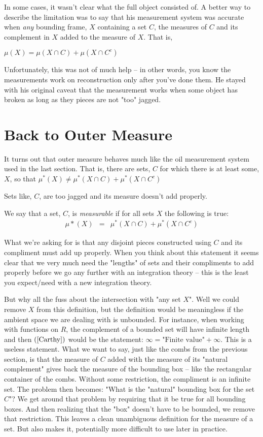 \documentclass{article}
\begin{document}
In some cases, it wasn't clear what the full object consisted of. A better way 
to describe the limitation was to say that his measurement system was accurate 
when {\em any} bounding frame, $X$ containing a set $C$, the measures of $C$ and 
its complement in $X$ added to the measure of $X$. That is,

$\mu(X) = \mu(X \cap C) + \mu(X \cap C^c)$

Unfortunately, this was not of much help -- in other words, you know the 
measurements work on reconstruction only after you've done them.
He stayed with his original caveat that the measurement works when some object has 
broken as long as they pieces are not "too" jagged.


\section{Back to Outer Measure}
It turns out that outer measure behaves much like the oil measurement system 
used in the last section. That is, there are sets, $C$ for which there is at 
least some, $X$, so that
$\mu^*(X) \neq \mu^*(X \cap C) + \mu^*(X \cap C^c)$

Sets like, $C$, are too jagged and its measure doesn't add properly.

We say that a set, $C$, is {\em measurable}
if for all sets $X$ the following is true:
\begin{eqnarray}
	\mu*(X) & = & \mu^*(X \cap C) + \mu^*(X \cap C^c) \label{Carthy}
\end{eqnarray}

What we're asking for is that any disjoint pieces constructed using $C$ and 
its compliment must add up properly. When you think about this statement it
seems clear that we very much need the "lengths" of sets and their compliments
to add properly before we go any further with an integration theory -- this 
is the least you expect/need with a new integration theory.

But why all the fuss about the intersection with "any set $X$".
Well we could remove $X$ from this definition, but the definition would be 
meaningless if the ambient space we are dealing with is unbounded. For instance,
when working with functions on $R$, the complement of a bounded set will have 
infinite length and then $(\ref{Carthy})$ would be the statement: 
$\infty = \text{"Finite value"} + \infty$.
This is a useless statement. What we want to say, just like the combs from the
previous section, is that the measure of $C$ added with the measure of its 
"natural complement" gives back the measure of the bounding box -- like the rectangular
container of the combs. Without some restriction, the compliment is an infinite set.
The problem then becomes: "What is the "natural" bounding box for the set $C$"?
We get around that problem by requiring that it be true for all bounding boxes.
And then realizing that the "box" doesn't have to be bounded, we remove that restriction.
This leaves a clean unambiguous definition for the measure of a set. But also makes it,
potentially more difficult to use later in practice.
 
\end{document}
